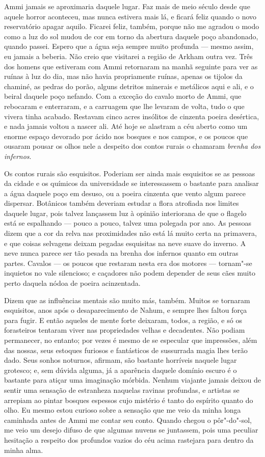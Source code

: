 Ammi jamais se aproximaria daquele lugar. Faz mais de meio século desde
que aquele horror aconteceu, mas nunca estivera mais lá, e ficará feliz
quando o novo reservatório apagar aquilo. Ficarei feliz, também, porque
não me agradou o modo como a luz do sol mudou de cor em torno da
abertura daquele poço abandonado, quando passei. Espero que a água seja
sempre muito profunda --- mesmo assim, eu jamais a beberia. Não creio
que visitarei a região de Arkham outra vez. Três dos homens que
estiveram com Ammi retornaram na manhã seguinte para ver as ruínas à luz
do dia, mas não havia propriamente ruínas, apenas os tijolos da chaminé,
as pedras do porão, alguns detritos minerais e metálicos aqui e ali, e o
beiral daquele poço nefando. Com a exceção do cavalo morto de Ammi, que
rebocaram e enterraram, e a carruagem que lhe levaram de volta, tudo o
que vivera tinha acabado. Restavam cinco acres insólitos de cinzenta
poeira desértica, e nada jamais voltou a nascer ali. Até hoje se
alastram a céu aberto como um enorme espaço devorado por ácido nos
bosques e nos campos, e os poucos que ousaram pousar os olhos nele a
despeito dos contos rurais o chamaram \textit{brenha dos infernos}.

Os contos rurais são esquisitos. Poderiam ser ainda mais esquisitos se
as pessoas da cidade e os químicos da universidade se interessassem o
bastante para analisar a água daquele poço em desuso, ou a poeira
cinzenta que vento algum parece dispersar. Botânicos também deveriam
estudar a flora atrofiada nos limites daquele lugar, pois talvez
lançassem luz à opinião interiorana de que o flagelo está se
espalhando
--- pouco a pouco, talvez uma
polegada por ano. As pessoas dizem que a cor da relva nas proximidades
não está lá muito certa na primavera, e que coisas selvagens deixam
pegadas esquisitas na neve suave do inverno. A neve nunca parece ser tão
pesada na brenha dos infernos quanto em outras partes. Cavalos --- os
poucos que restaram nesta era dos motores --- tornam"-se inquietos no
vale silencioso; e caçadores não podem depender de seus cães muito perto
daquela nódoa de poeira acinzentada.

Dizem que as influências mentais são muito más, também. Muitos se
tornaram esquisitos, anos após o desaparecimento de Nahum, e sempre lhes
faltou força para fugir. E então aqueles de mente forte deixaram, todos,
a região, e só os forasteiros tentaram viver nas propriedades velhas e
decadentes. Não podiam permanecer, no entanto; por vezes é mesmo de se
especular que impressões, além das nossas, seus estoques furiosos e
fantásticos de sussurrada magia lhes terão dado. Seus sonhos noturnos,
afirmam, são bastante horríveis naquele lugar grotesco; e, sem dúvida
alguma, já a aparência daquele domínio escuro é o bastante para atiçar
uma imaginação mórbida. Nenhum viajante jamais deixou de sentir uma
sensação de estranheza naquelas ravinas profundas, e artistas se
arrepiam ao pintar bosques espessos cujo mistério é tanto do espírito
quanto do olho. Eu mesmo estou curioso sobre a sensação que me veio da
minha longa caminhada antes de Ammi me contar seu conto. Quando chegou o
pôr"-do"-sol, me veio um desejo difuso de que algumas nuvens se juntassem,
pois uma peculiar hesitação a respeito dos profundos vazios do céu acima
rastejara para dentro da minha alma.

